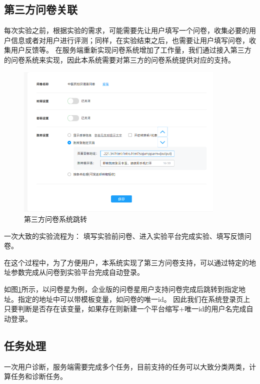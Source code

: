 \subsection{第三方问卷关联}
每次实验之前，根据实验的需求，可能需要先让用户填写一个问卷，收集必要的用户信息或者对用户进行评测；同样，在实验结束之后，也需要让用户填写问卷，收集用户反馈等。
在服务端重新实现问卷系统增加了工作量，我们通过接入第三方的问卷系统来实现，因此本系统需要对第三方的问卷系统提供对应的支持。


\begin{figure}[h]
    \centering
    \includegraphics[width=10cm]{images/wjx1.png}
    \caption{第三方问卷系统跳转}
    \label{fig:wjx-ssojump}
\end{figure}

一次大致的实验流程为： 填写实验前问卷、进入实验平台完成实验、填写反馈问卷。

在这个过程中，为了方便用户，本系统实现了第三方问卷支持，可以通过特定的地址参数完成从问卷到实验平台完成自动登录。

如图\ref{fig:wjx-ssojump}所示，以问卷星为例，企业版的问卷星用户支持问卷完成后跳转到指定地址。指定的地址中可以带模板变量，如问卷的唯一id。
因此我们在系统登录页上只要判断是否存在该变量，如果存在则新建一个平台缩写+唯一id的用户名完成自动登录。


\subsection{任务处理}
一次用户诊断，服务端需要完成多个任务，目前支持的任务可以大致分类两类，计算任务和诊断任务。


